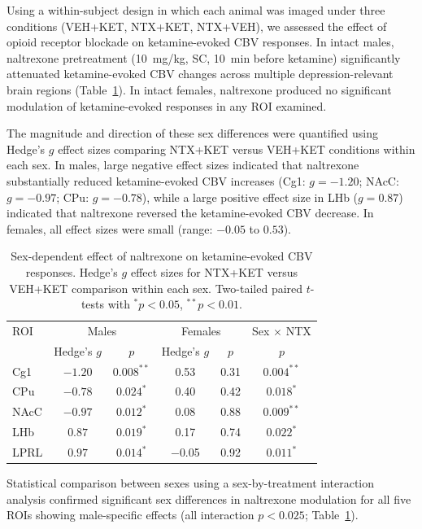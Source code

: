 \documentclass[11pt]{article}
\begin{document}
Using a within-subject design in which each animal was imaged under three conditions (VEH+KET, NTX+KET, NTX+VEH), we assessed the effect of opioid receptor blockade on ketamine-evoked CBV responses. In intact males, naltrexone pretreatment (10~mg/kg, SC, 10~min before ketamine) significantly attenuated ketamine-evoked CBV changes across multiple depression-relevant brain regions (Table~\ref{tab:sex_effect_sizes}). In intact females, naltrexone produced no significant modulation of ketamine-evoked responses in any ROI examined.

The magnitude and direction of these sex differences were quantified using Hedge's $g$ effect sizes comparing NTX+KET versus VEH+KET conditions within each sex. In males, large negative effect sizes indicated that naltrexone substantially reduced ketamine-evoked CBV increases (Cg1: $g = -1.20$; NAcC: $g = -0.97$; CPu: $g = -0.78$), while a large positive effect size in LHb ($g = 0.87$) indicated that naltrexone reversed the ketamine-evoked CBV decrease. In females, all effect sizes were small (range: $-0.05$ to $0.53$).

\begin{table}[H]
\centering
\caption{Sex-dependent effect of naltrexone on ketamine-evoked CBV responses. Hedge's $g$ effect sizes for NTX+KET versus VEH+KET comparison within each sex. Two-tailed paired $t$-tests with $^{*}p < 0.05$, $^{**}p < 0.01$.}
\label{tab:sex_effect_sizes}
\begin{tabular}{lccccc}
\toprule
ROI & \multicolumn{2}{c}{Males} & \multicolumn{2}{c}{Females} & Sex $\times$ NTX \\
 & Hedge's $g$ & $p$ & Hedge's $g$ & $p$ & $p$ \\
\midrule
Cg1 & $\mathbf{-1.20}$ & $0.008^{**}$ & 0.53 & 0.31 & $0.004^{**}$ \\
CPu & $\mathbf{-0.78}$ & $0.024^{*}$ & 0.40 & 0.42 & $0.018^{*}$ \\
NAcC & $\mathbf{-0.97}$ & $0.012^{*}$ & 0.08 & 0.88 & $0.009^{**}$ \\
LHb & $\mathbf{0.87}$ & $0.019^{*}$ & 0.17 & 0.74 & $0.022^{*}$ \\
LPRL & $\mathbf{0.97}$ & $0.014^{*}$ & $-$0.05 & 0.92 & $0.011^{*}$ \\
\bottomrule
\end{tabular}
\end{table}

Statistical comparison between sexes using a sex-by-treatment interaction analysis confirmed significant sex differences in naltrexone modulation for all five ROIs showing male-specific effects (all interaction $p < 0.025$; Table~\ref{tab:sex_effect_sizes}).
\end{document}
